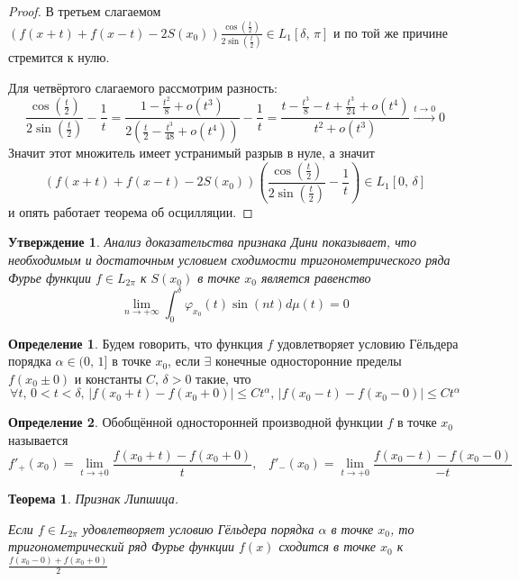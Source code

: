 \documentclass[a4paper,12pt]{article}
\renewcommand{\phi}{\ensuremath{\varphi}}
\renewcommand{\leq}{\ensuremath{\leqslant}}
\theoremstyle{plain}
\newtheorem{theorem}{Теорема}[section]
\newtheorem{proposition}{Утверждение}[section]
\theoremstyle{definition}
\newtheorem{definition}{Определение}[section]
\theoremstyle{remark}
\begin{document}
\begin{proof}
	В третьем слагаемом $(f(x + t) + f(x - t) - 2S(x_0))\frac{\cos(\frac{t}{2})}{2\sin(\frac{t}{2})} \in L_1[\delta,\,\pi]$ и по той же причине стремится к нулю.

	Для четвёртого слагаемого рассмотрим разность:
	\[\frac{\cos(\frac{t}{2})}{2\sin(\frac{t}{2})} - \frac{1}{t} = \frac{1 - \frac{t^2}{8} + o(t^3)}{2\left(\frac{t}{2} - \frac{t^3}{48} + o(t^4)\right)} - \frac{1}{t} = \frac{t - \frac{t^3}{8} - t + \frac{t^3}{24} + o(t^4)}{t^2 + o(t^3)} \stackrel{t \to 0}{\to} 0\]
	Значит этот множитель имеет устранимый разрыв в нуле, а значит
	\[(f(x + t) + f(x - t) - 2S(x_0))\left(\frac{\cos(\frac{t}{2})}{2\sin(\frac{t}{2})} - \frac{1}{t}\right) \in L_1[0,\,\delta]\]
	и опять работает теорема об осцилляции.
\end{proof}

\begin{proposition}
	\label{DINI_NOTE}
	Анализ доказательства признака Дини показывает, что необходимым и достаточным условием сходимости тригонометрического ряда Фурье функции $f \in L_{2\pi}$ к $S(x_0)$ в точке $x_0$ является равенство
	\[\lim_{n \to +\infty} \int_0^\delta \phi_{x_0}(t)\sin(nt)d\mu(t) = 0\]
\end{proposition}

\begin{definition} \label{GELDER}
	Будем говорить, что функция $f$ удовлетворяет условию Гёльдера порядка $\alpha \in (0,\,1]$ в точке $x_0$, если $\exists$ конечные односторонние пределы $f(x_0 \pm 0)$ и константы $C,\, \delta > 0$ такие, что
	\[
		\forall t,\, 0 < t < \delta,\, |f(x_0 + t) - f(x_0 + 0)| \leq Ct^\alpha,\, |f(x_0 - t) - f(x_0 - 0)| \leq Ct^\alpha
	\]
\end{definition}

\begin{definition}
	Обобщённой односторонней производной функции $f$ в точке $x_0$ называется
	\[f'_+(x_0) = \lim_{t \to +0} \frac{f(x_0 + t) - f(x_0 + 0)}{t},\;\;\; f'_-(x_0) = \lim_{t \to +0} \frac{f(x_0 - t) - f(x_0 - 0)}{-t}\]
\end{definition}

\begin{theorem}
	Признак Липшица.

	Если $f \in L_{2\pi}$ удовлетворяет условию Гёльдера порядка $\alpha$ в точке $x_0$, то тригонометрический ряд Фурье функции $f(x)$ сходится в точке $x_0$ к $\frac{f(x_0 - 0) + f(x_0 + 0)}{2}$
\end{theorem}
\end{document}
